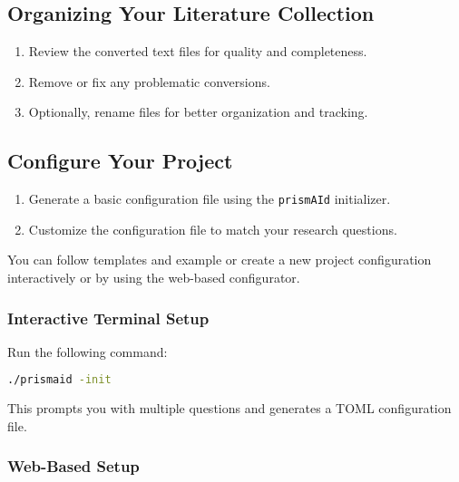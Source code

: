 \subsection{Organizing Your Literature Collection}

\begin{enumerate}
    \item Review the converted text files for quality and completeness.
    \item Remove or fix any problematic conversions.
    \item Optionally, rename files for better organization and tracking.
\end{enumerate}


\subsection{Configure Your Project}

\begin{enumerate}
    \item Generate a basic configuration file using the \texttt{prismAId} initializer.
    \item Customize the configuration file to match your research questions.
\end{enumerate}

You can follow templates and example or create a new project configuration interactively or by using the web-based configurator.

\subsubsection{Interactive Terminal Setup}
\begin{commandbox}
Run the following command:
\begin{lstlisting}[language=Bash]
./prismaid -init
\end{lstlisting}
\end{commandbox}

This prompts you with multiple questions and generates a TOML configuration file.

\subsubsection{Web-Based Setup}

